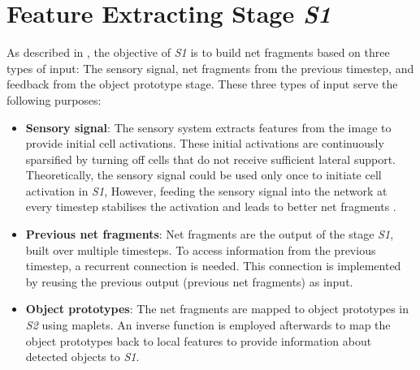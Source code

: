 \section{Feature Extracting Stage \emph{S1}}


As described in , the objective of \emph{S1} is to build net fragments based on three types of input: The sensory signal, net fragments from the previous timestep, and feedback from the object prototype stage.
These three types of input serve the following purposes:
\begin{itemize}
    \item \textbf{Sensory signal}: The sensory system extracts features from the image to provide initial cell activations. These initial activations are continuously sparsified by turning off cells that do not receive sufficient lateral support. Theoretically, the sensory signal could be used only once to initiate cell activation in \emph{S1}, However, feeding the sensory signal into the network at every timestep stabilises the activation and leads to better net fragments .
    \item \textbf{Previous net fragments}: Net fragments are the output of the stage \emph{S1}, built over multiple timesteps.
    To access information from the previous timestep, a recurrent connection is needed. This connection is implemented by reusing the previous output (previous net fragments) as input.
    \item \textbf{Object prototypes}: The net fragments are mapped to object prototypes in \emph{S2} using maplets. An inverse function is employed afterwards to map the object prototypes back to local features to provide information about detected objects to \emph{S1}.
\end{itemize}

